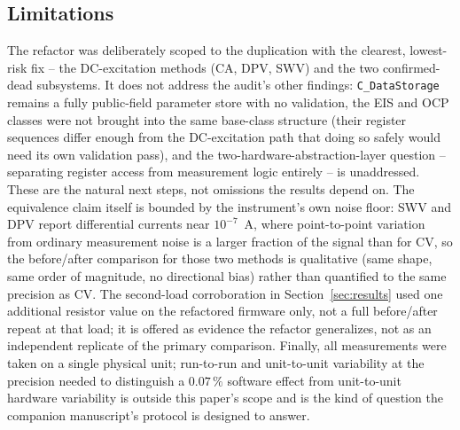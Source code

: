 \subsection{Limitations}
The refactor was deliberately scoped to the duplication with the clearest,
lowest-risk fix -- the DC-excitation methods (CA, DPV, SWV) and the two
confirmed-dead subsystems. It does not address the audit's other findings:
\texttt{C\_DataStorage} remains a fully public-field parameter store with no
validation, the EIS and OCP classes were not brought into the same
base-class structure (their register sequences differ enough from the
DC-excitation path that doing so safely would need its own validation pass),
and the two-hardware-abstraction-layer question -- separating register
access from measurement logic entirely -- is unaddressed. These are the
natural next steps, not omissions the results depend on. The equivalence
claim itself is bounded by the instrument's own noise floor: SWV and DPV
report differential currents near $10^{-7}$~A, where point-to-point
variation from ordinary measurement noise is a larger fraction of the
signal than for CV, so the before/after comparison for those two methods is
qualitative (same shape, same order of magnitude, no directional bias)
rather than quantified to the same precision as CV. The second-load
corroboration in Section~\ref{sec:results} used one additional resistor
value on the refactored firmware only, not a full before/after repeat at
that load; it is offered as evidence the refactor generalizes, not as an
independent replicate of the primary comparison. Finally, all measurements
were taken on a single physical unit; run-to-run and unit-to-unit
variability at the precision needed to distinguish a $0.07\,\%$ software
effect from unit-to-unit hardware variability is outside this paper's scope
and is the kind of question the companion manuscript's protocol is designed
to answer.
